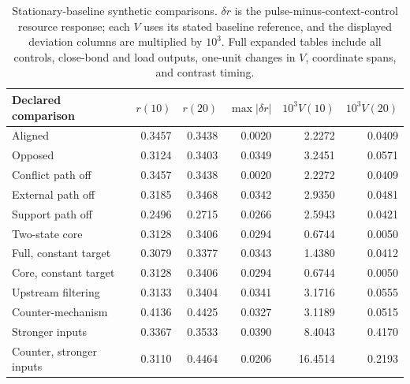 \begin{table}[H]\centering\footnotesize

\begin{tabularx}{\textwidth}{@{}Yrrrrr@{}}\toprule

Declared comparison & $r(10)$ & $r(20)$ & $\max|\delta r|$ & $10^3V(10)$ & $10^3V(20)$ \\\midrule

Aligned & 0.3457 & 0.3438 & 0.0020 & 2.2272 & 0.0409 \\

Opposed & 0.3124 & 0.3403 & 0.0349 & 3.2451 & 0.0571 \\

Conflict path off & 0.3457 & 0.3438 & 0.0020 & 2.2272 & 0.0409 \\

External path off & 0.3185 & 0.3468 & 0.0342 & 2.9350 & 0.0481 \\

Support path off & 0.2496 & 0.2715 & 0.0266 & 2.5943 & 0.0421 \\

Two-state core & 0.3128 & 0.3406 & 0.0294 & 0.6744 & 0.0050 \\

Full, constant target & 0.3079 & 0.3377 & 0.0343 & 1.4380 & 0.0412 \\

Core, constant target & 0.3128 & 0.3406 & 0.0294 & 0.6744 & 0.0050 \\

Upstream filtering & 0.3133 & 0.3404 & 0.0341 & 3.1716 & 0.0555 \\

Counter-mechanism & 0.4136 & 0.4425 & 0.0327 & 3.1189 & 0.0515 \\

Stronger inputs & 0.3367 & 0.3533 & 0.0390 & 8.4043 & 0.4170 \\

Counter, stronger inputs & 0.3110 & 0.4464 & 0.0206 & 16.4514 & 0.2193 \\

\bottomrule\end{tabularx}

\caption{Stationary-baseline synthetic comparisons. $\delta r$ is the pulse-minus-context-control resource response; each $V$ uses its stated baseline reference, and the displayed deviation columns are multiplied by $10^3$. Full expanded tables include all controls, close-bond and load outputs, one-unit changes in $V$, coordinate spans, and contrast timing.}\label{tab:synthetic-results}\end{table}

